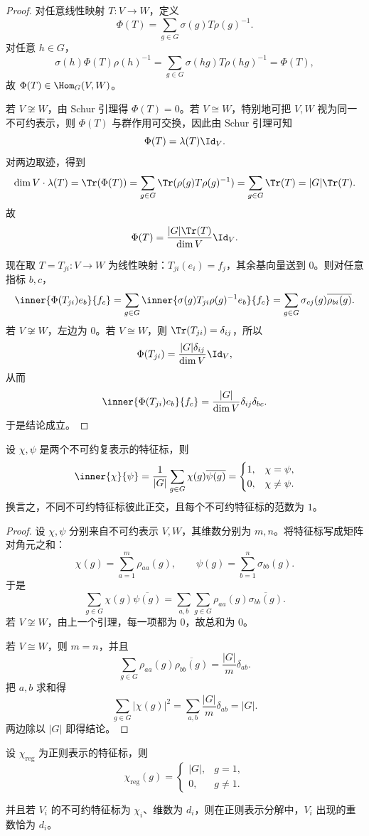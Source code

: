 \begin{proof}
对任意线性映射 $T:V\to W$，定义
\[
\Phi(T)=\sum_{g\in G}\sigma(g)T\rho(g)^{-1}.
\]
对任意 $h\in G$，
\[
\sigma(h)\Phi(T)\rho(h)^{-1}
=\sum_{g\in G}\sigma(hg)T\rho(hg)^{-1}=
\Phi(T),
\]
故 $\Phi(T)\in \Hom_G(V,W)$。

若 $V\not\cong W$，由 Schur 引理得 $\Phi(T)=0$。若 $V\cong W$，特别地可把 $V,W$ 视为同一不可约表示，则 $\Phi(T)$ 与群作用可交换，因此由 Schur 引理可知
\[
\Phi(T)=\lambda(T)\Id_V.
\]
对两边取迹，得到
\[
\dim V\cdot \lambda(T)=\Tr(\Phi(T))
=\sum_{g\in G}\Tr(\rho(g)T\rho(g)^{-1})
=\sum_{g\in G}\Tr(T)=|G|\Tr(T).
\]
故
\[
\Phi(T)=\frac{|G|\Tr(T)}{\dim V}\Id_V.
\]

现在取 $T=T_{ji}:V\to W$ 为线性映射：$T_{ji}(e_i)=f_j$，其余基向量送到 $0$。则对任意指标 $b,c$，
\[
\inner{\Phi(T_{ji})e_b}{f_c}
=\sum_{g\in G}\inner{\sigma(g)T_{ji}\rho(g)^{-1}e_b}{f_c}
=\sum_{g\in G}\sigma_{cj}(g)\overline{\rho_{bi}(g)}.
\]
若 $V\not\cong W$，左边为 $0$。若 $V\cong W$，则 $\Tr(T_{ji})=\delta_{ij}$，所以
\[
\Phi(T_{ji})=\frac{|G|\delta_{ij}}{\dim V}\Id_V,
\]
从而
\[
\inner{\Phi(T_{ji})e_b}{f_c}=\frac{|G|}{\dim V}\delta_{ij}\delta_{bc}.
\]
于是结论成立。
\end{proof}

\begin{theorem}[第一正交关系]
设 $\chi,\psi$ 是两个不可约复表示的特征标，则
\[
\inner{\chi}{\psi}=\frac{1}{|G|}\sum_{g\in G}\chi(g)\overline{\psi(g)}=
\begin{cases}
1,& \chi=\psi,\\
0,& \chi\neq \psi.
\end{cases}
\]
换言之，不同不可约特征标彼此正交，且每个不可约特征标的范数为 $1$。
\end{theorem}

\begin{proof}
设 $\chi,\psi$ 分别来自不可约表示 $V,W$，其维数分别为 $m,n$。将特征标写成矩阵对角元之和：
\[
\chi(g)=\sum_{a=1}^m \rho_{aa}(g),
\qquad
\psi(g)=\sum_{b=1}^n \sigma_{bb}(g).
\]
于是
\[
\sum_{g\in G}\chi(g)\overline{\psi(g)}
=\sum_{a,b}\sum_{g\in G}\rho_{aa}(g)\overline{\sigma_{bb}(g)}.
\]
若 $V\not\cong W$，由上一个引理，每一项都为 $0$，故总和为 $0$。

若 $V\cong W$，则 $m=n$，并且
\[
\sum_{g\in G}\rho_{aa}(g)\overline{\rho_{bb}(g)}
=\frac{|G|}{m}\delta_{ab}.
\]
把 $a,b$ 求和得
\[
\sum_{g\in G}|\chi(g)|^2
=\sum_{a,b}\frac{|G|}{m}\delta_{ab}=|G|.
\]
两边除以 $|G|$ 即得结论。
\end{proof}

\begin{proposition}[正则表示的特征标]
设 $\chi_{\mathrm{reg}}$ 为正则表示的特征标，则
\[
\chi_{\mathrm{reg}}(g)=
\begin{cases}
|G|, & g=1,\\
0, & g\neq 1.
\end{cases}
\]

并且若 $V_i$ 的不可约特征标为 $\chi_i$、维数为 $d_i$，则在正则表示分解中，$V_i$ 出现的重数恰为 $d_i$。
\end{proposition}

